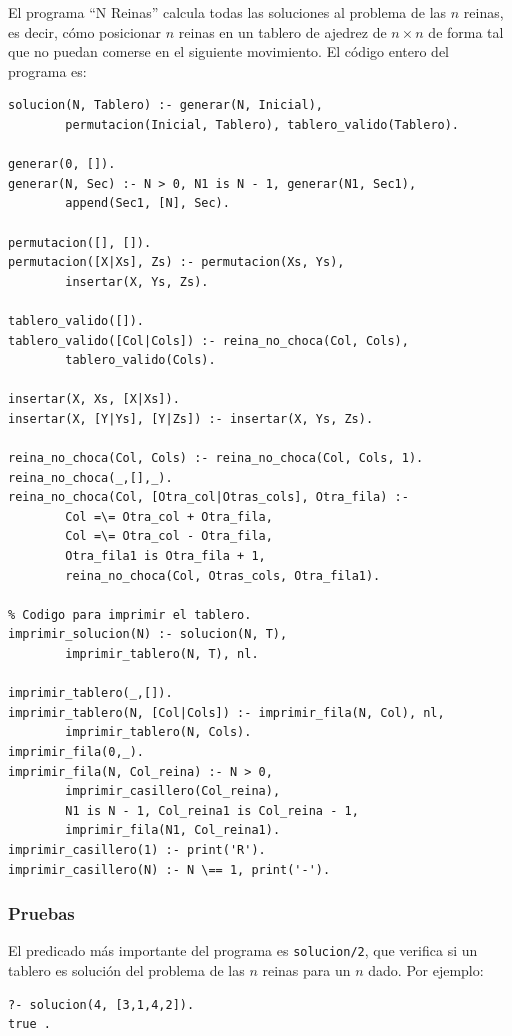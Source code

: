 \documentclass[12pt,titlepage]{article}
\begin{document}
El programa ``N Reinas'' calcula todas las soluciones al problema de las $n$ reinas\cite{nreinas}, es decir, cómo posicionar $n$ reinas en un tablero de ajedrez de $n \times n$ de forma tal que no puedan comerse en el siguiente movimiento. El código entero del programa es:
\begin{lstlisting}
solucion(N, Tablero) :- generar(N, Inicial), 
        permutacion(Inicial, Tablero), tablero_valido(Tablero).

generar(0, []).
generar(N, Sec) :- N > 0, N1 is N - 1, generar(N1, Sec1), 
        append(Sec1, [N], Sec).

permutacion([], []).
permutacion([X|Xs], Zs) :- permutacion(Xs, Ys), 
        insertar(X, Ys, Zs).

tablero_valido([]).
tablero_valido([Col|Cols]) :- reina_no_choca(Col, Cols), 
        tablero_valido(Cols).

insertar(X, Xs, [X|Xs]).
insertar(X, [Y|Ys], [Y|Zs]) :- insertar(X, Ys, Zs).

reina_no_choca(Col, Cols) :- reina_no_choca(Col, Cols, 1).
reina_no_choca(_,[],_).
reina_no_choca(Col, [Otra_col|Otras_cols], Otra_fila) :-
        Col =\= Otra_col + Otra_fila, 
        Col =\= Otra_col - Otra_fila,
        Otra_fila1 is Otra_fila + 1,
        reina_no_choca(Col, Otras_cols, Otra_fila1).

% Codigo para imprimir el tablero.
imprimir_solucion(N) :- solucion(N, T), 
        imprimir_tablero(N, T), nl.

imprimir_tablero(_,[]).
imprimir_tablero(N, [Col|Cols]) :- imprimir_fila(N, Col), nl, 
        imprimir_tablero(N, Cols).
imprimir_fila(0,_).
imprimir_fila(N, Col_reina) :- N > 0, 
        imprimir_casillero(Col_reina), 
        N1 is N - 1, Col_reina1 is Col_reina - 1, 
        imprimir_fila(N1, Col_reina1).
imprimir_casillero(1) :- print('R').
imprimir_casillero(N) :- N \== 1, print('-').
\end{lstlisting}

\subsubsection{Pruebas}
\label{sec:pruebasnreinas}

El predicado más importante del programa es \lstinline|solucion/2|, que verifica si un tablero es solución del problema de las $n$ reinas para un $n$ dado. Por ejemplo:
\begin{lstlisting}
?- solucion(4, [3,1,4,2]).
true .
\end{lstlisting}
\end{document}
